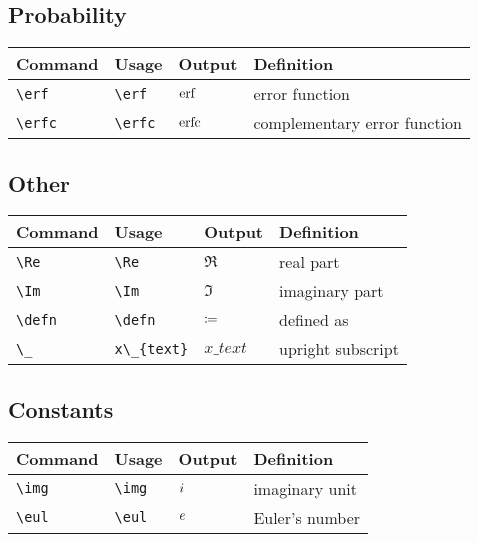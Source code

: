 \documentclass[11pt]{article}
\begin{document}
\subsection{Probability}

\begin{tabular}{llll}
    Command      & Usage        & Output  & Definition                   \\
    \hline
    \verb|\erf|  & \verb|\erf|  & $\operatorname{erf}$  & error function               \\
    \verb|\erfc| & \verb|\erfc| & $\operatorname{erfc}$ & complementary error function \\
\end{tabular}

\subsection{Other}

\begin{tabular}{llll}
    Command      & Usage            & Output      & Definition        \\
    \hline
    \verb|\Re|   & \verb|\Re|       & $\Re$       & real part         \\
    \verb|\Im|   & \verb|\Im|       & $\Im$       & imaginary part    \\
    \verb|\defn| & \verb|\defn|     & $\coloneq$     & defined as        \\
    \verb|\_|    & \verb|x\_{text}| & $x\_{text}$ & upright subscript \\
\end{tabular}

\subsection{Constants}

\begin{tabular}{llll}
    Command     & Usage       & Output & Definition     \\
    \hline
    \verb|\img| & \verb|\img| & $i$ & imaginary unit \\
    \verb|\eul| & \verb|\eul| & $e$ & Euler's number \\
\end{tabular}
\end{document}
